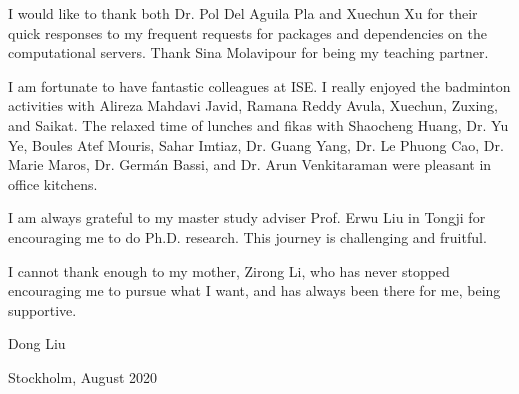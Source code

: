 I would like to thank both Dr. Pol Del Aguila Pla and Xuechun Xu for their quick responses to my frequent requests for packages and dependencies on the computational servers. Thank Sina Molavipour for being my teaching partner.


I am fortunate to have fantastic colleagues at ISE. I really enjoyed the badminton activities with Alireza Mahdavi Javid, Ramana Reddy Avula, Xuechun, Zuxing, and Saikat. The relaxed time of lunches and fikas with Shaocheng Huang, Dr. Yu Ye, Boules Atef Mouris, Sahar Imtiaz, Dr. Guang Yang, Dr. Le Phuong Cao, Dr. Marie Maros, Dr. Germ\'{a}n Bassi, and Dr. Arun Venkitaraman were pleasant in office kitchens.

I am always grateful to my master study adviser Prof. Erwu Liu in Tongji for encouraging me to do Ph.D. research. This journey is challenging and fruitful.

I cannot thank enough to my mother, Zirong Li, who has never stopped encouraging me to pursue what I want, and has always been there for me, being supportive. \newline
\newline


\hfill
Dong Liu

\hfill
Stockholm, August 2020





